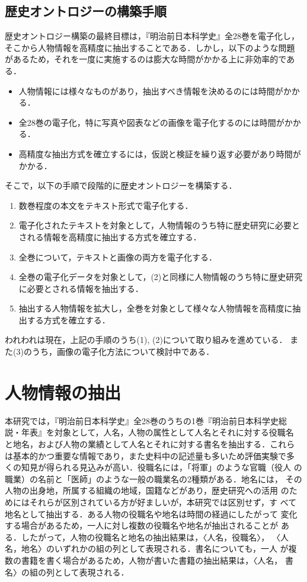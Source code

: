 \documentclass[japanese]{jnlp_1.4}
\begin{document}
\subsection{歴史オントロジーの構築手順}

歴史オントロジー構築の最終目標は，『明治前日本科学史』全28巻を電子化し，
そこから人物情報を高精度に抽出することである．しかし，以下のような問題
があるため，それを一度に実施するのは膨大な時間がかかる上に非効率的であ
る．

\begin{itemize}
\item 人物情報には様々なものがあり，抽出すべき情報を決めるのには時間がかかる．
\item 全28巻の電子化，特に写真や図表などの画像を電子化するのには時間がかかる．
\item 高精度な抽出方式を確立するには，仮説と検証を繰り返す必要があり時間がかかる．
\end{itemize}

そこで，以下の手順で段階的に歴史オントロジーを構築する．

\begin{enumerate}
\item 数巻程度の本文をテキスト形式で電子化する．
\item 電子化されたテキストを対象として，人物情報のうち特に歴史研究に必要とされる情報を高精度に抽出する方式を確立する．
\item 全巻について，テキストと画像の両方を電子化する．
\item 全巻の電子化データを対象として，(2)と同様に人物情報のうち特に歴史研究に必要とされる情報を抽出する．
\item 抽出する人物情報を拡大し，全巻を対象として様々な人物情報を高精度に抽出する方式を確立する．
\end{enumerate}

われわれは現在，上記の手順のうち(1), (2)について取り組みを進めている．
また(3)のうち，画像の電子化方法について検討中である．



\section{人物情報の抽出}
本研究では，『明治前日本科学史』全28巻のうちの1巻『明治前日本科学史総
説・年表』を対象として，人名，人物の属性として人名とそれに対する役職名
と地名，および人物の業績として人名とそれに対する書名を抽出する．これら
は基本的かつ重要な情報であり，また史料中の記述量も多いため評価実験で多
くの知見が得られる見込みが高い．役職名には，「将軍」のような官職（役人
の職業）の名前と「医師」のような一般の職業名の2種類がある．地名には，
その人物の出身地，所属する組織の地域，国籍などがあり，歴史研究への活用
のためにはそれらが区別されている方が好ましいが，本研究では区別せず，す
べて地名として抽出する．ある人物の役職名や地名は時間の経過にしたがって
変化する場合があるため，一人に対し複数の役職名や地名が抽出されることが
ある．したがって，人物の役職名と地名の抽出結果は，〈人名，役職名〉，
〈人名，地名〉のいずれかの組の列として表現される．書名についても，一人
が複数の書籍を書く場合があるため，人物が書いた書籍の抽出結果は，〈人名，
書名〉の組の列として表現される．
\end{document}
